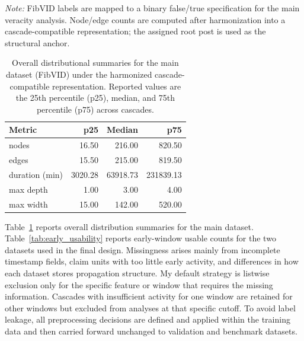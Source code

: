 \begin{table}[htbp]
  \centering
  \caption{Main dataset (FibVID) descriptive statistics by veracity label under the harmonized cascade-compatible representation. Entries are medians computed after preprocessing and representation building.}
  \label{tab:main_by_label}

  \vspace{0.3em}
  {\footnotesize \textit{Note:} FibVID labels are mapped to a binary false/true specification for the main veracity analysis. Node/edge counts are computed after harmonization into a cascade-compatible representation; the assigned root post is used as the structural anchor.}
\end{table}

\begin{table}[htbp]
  \centering
  \caption{Overall distributional summaries for the main dataset (FibVID) under the harmonized cascade-compatible representation. Reported values are the 25th percentile (p25), median, and 75th percentile (p75) across cascades.}
  \label{tab:main_overall}
  \begin{tabular}{lrrr}
    \toprule
    Metric & p25 & Median & p75 \\
    \midrule
    nodes          & 16.50 & 216.00 & 820.50 \\
    edges          & 15.50 & 215.00 & 819.50 \\
    duration (min) & 3020.28 & 63918.73 & 231839.13 \\
    max depth      & 1.00 & 3.00 & 4.00 \\
    max width      & 15.00 & 142.00 & 520.00 \\
    \bottomrule
  \end{tabular}
\end{table}

Table~\ref{tab:main_overall} reports overall distribution summaries for the main dataset. Table~\ref{tab:early_usability} reports early-window usable counts for the two datasets used in the final design. Missingness arises mainly from incomplete timestamp fields, claim units with too little early activity, and differences in how each dataset stores propagation structure. My default strategy is listwise exclusion only for the specific feature or window that requires the missing information. Cascades with insufficient activity for one window are retained for other windows but excluded from analyses at that specific cutoff. To avoid label leakage, all preprocessing decisions are defined and applied within the training data and then carried forward unchanged to validation and benchmark datasets.


